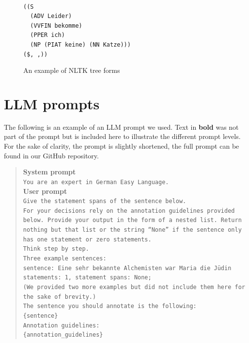 \documentclass[11pt]{article}
\begin{document}
\begin{figure}
\begin{verbatim}

((S
  (ADV Leider)
  (VVFIN bekomme)
  (PPER ich)
  (NP (PIAT keine) (NN Katze)))
($, ,))
\end{verbatim}
    
\caption{An example of NLTK tree forms}
\label{fig:nltk-tree-forms}
\end{figure}


\section{LLM prompts}\label{appendix:llm prompts}

The following is an example of an LLM prompt we used. Text in \textbf{bold} was not part of the prompt but is included here to illustrate the different prompt levels. For the sake of clarity, the prompt is slightly shortened, the full prompt can be found in our GitHub repository.



\noindent
\begin{quote}
\begin{small}
\noindent
\textbf{System prompt}\\
\texttt{You are an expert in German Easy Language.} \\
\textbf{User prompt}\\
\texttt{Give the statement spans of the sentence below.} \\
\texttt{For your decisions rely on the annotation guidelines provided below. Provide your output in the form of a nested list. Return nothing but that list or the string “None” if the sentence only has one statement or zero statements.} \\
\texttt{Think step by step.} \\
\texttt{Three example sentences:} \\
\texttt{sentence: Eine sehr bekannte Alchemisten war Maria die Jüdin} \\
\texttt{statements: 1, statement spans: None;}\\
\texttt{(We provided two more examples but did not include them here for the sake of brevity.)}\\

\texttt{The sentence you should annotate is the following:} \\
\texttt{\{sentence\}} \\
\texttt{Annotation guidelines:} \\
\texttt{\{annotation\_guidelines\}}
\end{small}
\end{quote}
\end{document}
